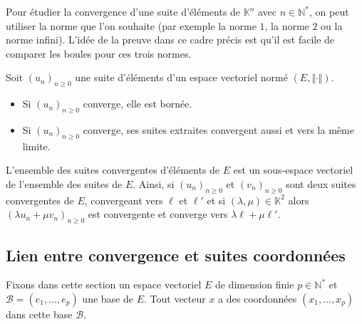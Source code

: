 \documentclass[french,11pt,twoside]{VcCours}
\begin{document}
%

\begin{Exemple} Pour étudier la convergence d'une suite d'éléments de $\mathbb{K}^n$ avec $n \in \mathbb{N}^*$, on peut utiliser la norme que l'on souhaite (par exemple la norme $1$, la norme $2$ ou la norme infini). L'idée de la preuve dans ce cadre précis est qu'il est facile de comparer les boules pour ces trois normes.
\end{Exemple}

\begin{Proposition}{} Soit $(u_n)_{n \geq 0}$ une suite d'éléments d'un espace vectoriel normé $(E, \Vert \cdot \Vert)$.

\begin{itemize}
\item Si $(u_n)_{n \geq 0}$ converge, elle est bornée.
\item Si $(u_n)_{n \geq 0}$ converge, ses suites extraites convergent aussi et vers la même limite.
\end{itemize}
\end{Proposition}

\begin{Proposition}{} L'ensemble des suites convergentes d'éléments de $E$ est un sous-espace vectoriel de l'ensemble des suites de $E$. Ainsi, si $(u_n)_{n \geq 0}$ et $(v_n)_{n \geq 0}$ sont deux suites convergentes de $E$, convergeant vers $\ell$ et $\ell'$ et si $(\lambda, \mu) \in \mathbb{K}^2$ alors $(\lambda u_n + \mu v_n)_{n \geq 0}$ est convergente et converge vers $\lambda \ell + \mu \ell'$.
\end{Proposition}


\subsection{Lien entre convergence et suites coordonnées}

Fixons dans cette section un espace vectoriel $E$ de dimension finie $p \in \mathbb{N}^*$ et $\mathcal{B} = (e_1, \ldots, e_p)$ une base de $E$. Tout vecteur $x$ a des coordonnées $(x_1, \ldots, x_p)$ dans cette base $\mathcal{B}$. 
\end{document}
